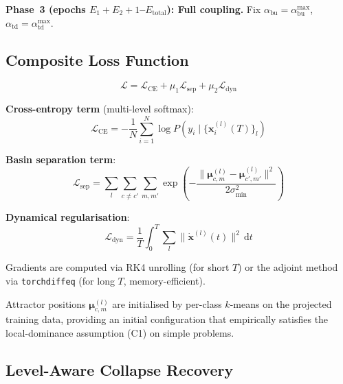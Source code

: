 \documentclass[11pt,a4paper]{article}
\begin{document}
\textbf{Phase~3 (epochs $E_1+E_2+1$--$E_{\mathrm{total}}$): Full coupling.}
Fix $\alpha_{\mathrm{bu}} = \alpha_{\mathrm{bu}}^{\max}$,
$\alpha_{\mathrm{td}} = \alpha_{\mathrm{td}}^{\max}$.

\subsection{Composite Loss Function}

\begin{equation}
  \mathcal{L} = \mathcal{L}_{\mathrm{CE}} + \mu_1 \mathcal{L}_{\mathrm{sep}} + \mu_2 \mathcal{L}_{\mathrm{dyn}}
\label{eq:loss}
\end{equation}

\textbf{Cross-entropy term} (multi-level softmax):
\begin{equation}
  \mathcal{L}_{\mathrm{CE}} = -\frac{1}{N} \sum_{i=1}^{N} \log P(y_i \mid \{\mathbf{x}_i^{(l)}(T)\}_l)
\end{equation}

\textbf{Basin separation term}:
\begin{equation}
  \mathcal{L}_{\mathrm{sep}} = \sum_{l} \sum_{c \ne c'} \sum_{m,m'}
    \exp\!\left(-\frac{\|\boldsymbol{\mu}^{(l)}_{c,m} - \boldsymbol{\mu}^{(l)}_{c',m'}\|^2}
                       {2\sigma^2_{\min}}\right)
\end{equation}

\textbf{Dynamical regularisation}:
\begin{equation}
  \mathcal{L}_{\mathrm{dyn}} = \frac{1}{T}\int_0^T \sum_l \|\dot{\mathbf{x}}^{(l)}(t)\|^2\, \mathrm{d}t
\end{equation}

Gradients are computed via RK4 unrolling (for short $T$) or the adjoint
method~\cite{chen2018neural} via \texttt{torchdiffeq} (for long $T$, memory-efficient).

Attractor positions $\boldsymbol{\mu}^{(l)}_{c,m}$ are initialised by per-class $k$-means
on the projected training data, providing an initial configuration that empirically
satisfies the local-dominance assumption (C1) on simple problems.

\subsection{Level-Aware Collapse Recovery}
\label{sec:p6}
\end{document}
